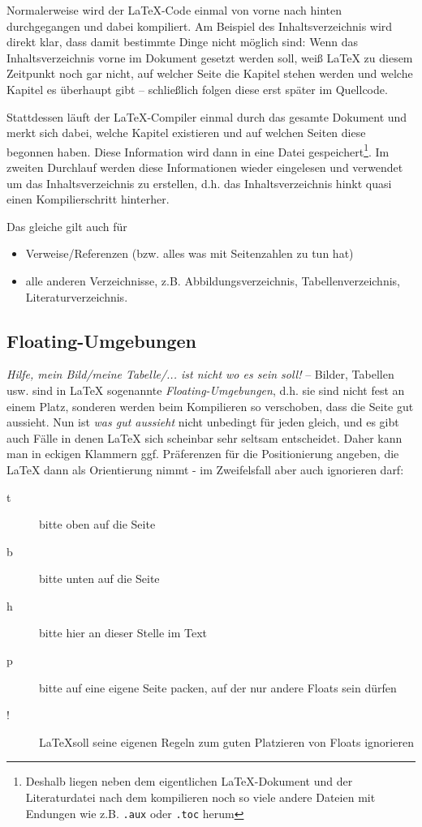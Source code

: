 			
			Normalerweise wird der \LaTeX-Code einmal von vorne nach hinten durchgegangen und dabei kompiliert.
%			
			Am Beispiel des Inhaltsverzeichnis wird direkt klar, dass damit bestimmte Dinge nicht möglich sind:
				Wenn das Inhaltsverzeichnis vorne im Dokument gesetzt werden soll, weiß \LaTeX{} zu diesem Zeitpunkt noch gar nicht, auf welcher Seite die Kapitel stehen werden und welche Kapitel es überhaupt gibt -- schließlich folgen diese erst später im Quellcode.
			
			Stattdessen läuft der \LaTeX-Compiler einmal durch das gesamte Dokument und merkt sich dabei, welche Kapitel existieren und auf welchen Seiten diese begonnen haben.
				Diese Information wird dann in eine Datei gespeichert\footnote{Deshalb liegen neben dem eigentlichen \LaTeX-Dokument und der Literaturdatei nach dem kompilieren noch so viele andere Dateien mit Endungen wie z.B. \lstinline|.aux| oder \lstinline|.toc| herum}.
%			
			Im zweiten Durchlauf werden diese Informationen wieder eingelesen und verwendet um das Inhaltsverzeichnis zu erstellen, d.h. das Inhaltsverzeichnis hinkt quasi einen Kompilierschritt hinterher.
			\bigskip
			
			\noindent Das gleiche gilt auch für
			\begin{itemize}
			\item Verweise/Referenzen (bzw. alles was mit Seitenzahlen zu tun hat)
			\item alle anderen Verzeichnisse, z.B. Abbildungsverzeichnis, Tabellenverzeichnis, Literaturverzeichnis.
			\end{itemize}
		
		

		
		\subsection{Floating-Umgebungen}\label{sec:wissen:float}
			\textit{Hilfe, mein Bild/meine Tabelle/... ist nicht wo es sein soll!} --
			Bilder, Tabellen usw. sind in \LaTeX{} sogenannte \emph{Floating-Umgebungen}, d.h. sie sind nicht fest an einem Platz, sonderen werden beim Kompilieren so verschoben, dass die Seite gut aussieht.
			Nun ist \emph{was gut aussieht} nicht unbedingt für jeden gleich, und es gibt auch Fälle in denen \LaTeX{} sich scheinbar sehr seltsam entscheidet.
			Daher kann man in eckigen Klammern ggf. Präferenzen für die Positionierung angeben, die \LaTeX{} dann als Orientierung nimmt - im Zweifelsfall aber auch ignorieren darf:
			
			\begin{description}
			\item[t] bitte oben auf die Seite
			\item[b] bitte unten auf die Seite
			\item[h] bitte hier an dieser Stelle im Text
			\item[p] bitte auf eine eigene Seite packen, auf der nur andere Floats sein dürfen
			\item[!] \LaTeX soll seine eigenen Regeln zum guten Platzieren von Floats ignorieren
			\end{description}
		
